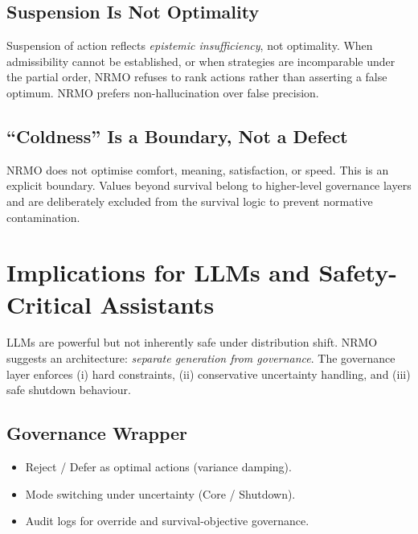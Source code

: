 \subsection{Suspension Is Not Optimality}
\label{sec:foundations-9-2-suspension-not-optimality}

Suspension of action reflects \emph{epistemic insufficiency}, not
optimality. When admissibility cannot be established, or when
strategies are incomparable under the partial order, NRMO refuses to
rank actions rather than asserting a false optimum. NRMO prefers
non-hallucination over false precision.

\subsection{``Coldness'' Is a Boundary, Not a Defect}
\label{sec:foundations-9-3-coldness-boundary}

NRMO does not optimise comfort, meaning, satisfaction, or speed.
This is an explicit boundary. Values beyond survival belong to
higher-level governance layers and are deliberately excluded from
the survival logic to prevent normative contamination.

\section{Implications for LLMs and Safety-Critical Assistants}
\label{sec:foundations-10-llm-implications}

LLMs are powerful but not inherently safe under distribution shift.
NRMO suggests an architecture: \emph{separate generation from
governance}. The governance layer enforces (i) hard constraints,
(ii) conservative uncertainty handling, and (iii) safe shutdown
behaviour.

\subsection{Governance Wrapper}
\label{sec:foundations-10-1-governance-wrapper}

\begin{itemize}
\item Reject / Defer as optimal actions (variance damping).
\item Mode switching under uncertainty (Core / Shutdown).
\item Audit logs for override and survival-objective governance.
\end{itemize}

